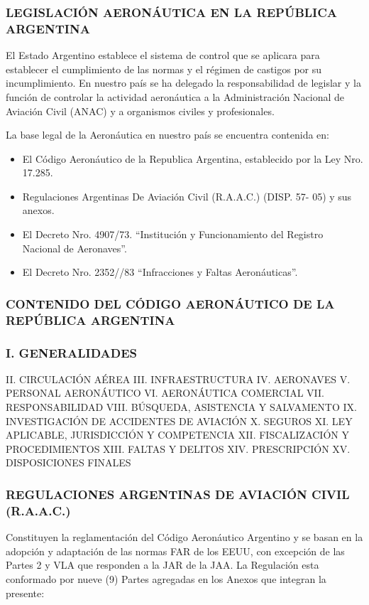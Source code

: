 \subsubsection*{LEGISLACIÓN AERONÁUTICA EN LA REPÚBLICA ARGENTINA}


El Estado Argentino establece el sistema de control que se aplicara para establecer el cumplimiento de las normas y el régimen de castigos por su incumplimiento. En nuestro país se ha delegado la responsabilidad de legislar y la función de controlar la actividad aeronáutica a la Administración Nacional de Aviación Civil (ANAC) y a organismos civiles y profesionales.

La base legal de la Aeronáutica en nuestro país se encuentra contenida en:

\begin{itemize}
  \item El Código Aeronáutico de la Republica Argentina, establecido por la Ley Nro. 17.285.
  \item Regulaciones Argentinas De Aviación Civil (R.A.A.C.) (DISP. 57- 05) y sus anexos.
  \item El Decreto Nro. 4907/73. “Institución y Funcionamiento del Registro Nacional de Aeronaves”.
  \item El Decreto Nro. 2352//83 “Infracciones y Faltas Aeronáuticas”.
\end{itemize}
\subsubsection*{CONTENIDO DEL CÓDIGO AERONÁUTICO DE LA REPÚBLICA ARGENTINA}
\subsubsection*{I. GENERALIDADES}
II. CIRCULACIÓN AÉREA III. INFRAESTRUCTURA IV. AERONAVES V. PERSONAL AERONÁUTICO VI. AERONÁUTICA COMERCIAL VII. RESPONSABILIDAD VIII. BÚSQUEDA, ASISTENCIA Y SALVAMENTO IX. INVESTIGACIÓN DE ACCIDENTES DE AVIACIÓN X. SEGUROS XI. LEY APLICABLE, JURISDICCIÓN Y COMPETENCIA XII. FISCALIZACIÓN Y PROCEDIMIENTOS XIII. FALTAS Y DELITOS XIV. PRESCRIPCIÓN XV. DISPOSICIONES FINALES

\subsubsection*{REGULACIONES ARGENTINAS DE AVIACIÓN CIVIL (R.A.A.C.)}
Constituyen la reglamentación del Código Aeronáutico Argentino y se basan en la adopción y adaptación de las normas FAR de los EEUU, con excepción de las Partes 2 y VLA que responden a la JAR de la JAA. La Regulación esta conformado por nueve (9) Partes agregadas en los Anexos que integran la presente:

